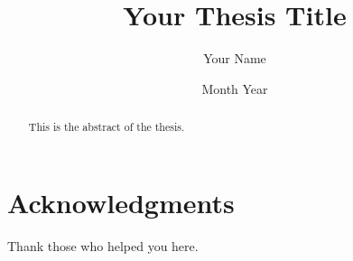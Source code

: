 \documentclass[12pt,a4paper]{report}
\begin{document}
\title{Your Thesis Title}
\author{Your Name}
\date{Month Year}
\maketitle

\begin{abstract}
    This is the abstract of the thesis.
\end{abstract}

\chapter*{Acknowledgments}
Thank those who helped you here.

\tableofcontents
\listoffigures
\listoftables













\appendix


\end{document}
